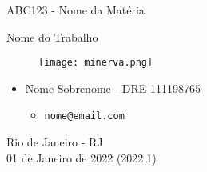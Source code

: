 \begin{titlepage}
    \begin{center}
        \LARGE
        ABC123 - Nome da Matéria

        \vspace{1.5cm}

        \Huge
        Nome do Trabalho

        \vspace{1.5cm}

        \Huge
        \begin{figure}[h]
            \centering
            \texttt{[image: minerva.png]}
        \end{figure}

        \vspace{2.5cm}

        \large
        \begin{itemize}
            \item Nome Sobrenome - DRE 111198765
            \begin{itemize}
                \item \texttt{nome@email.com}
            \end{itemize}
        \end{itemize}

        \vspace{1.5cm}


        \vspace{0.5cm}
        \vfill
        \vspace{1.0cm}
        
        \large
        Rio de Janeiro - RJ\\
        01 de Janeiro de 2022 (2022.1)

    \end{center}
\end{titlepage}
